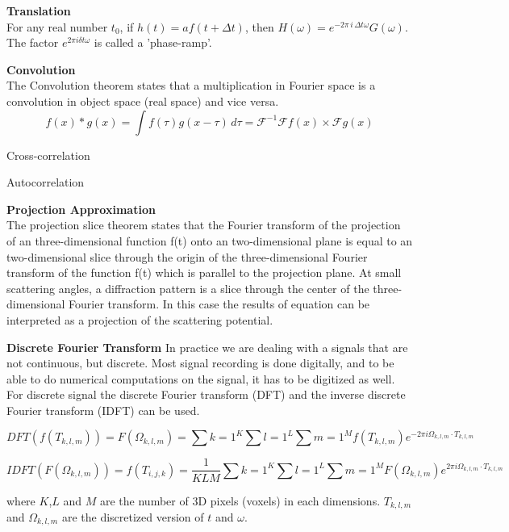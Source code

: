 \textbf{Translation}\\
	For any real number $t_0$, if $h(t) = a f(t+\Delta t)$, then $H(\omega) = e^{-2\pi\,i\,\Delta t \omega} G(\omega)$. The factor $e^{2 \pi i \delta t \omega}$ is called a 'phase-ramp'.

\textbf{Convolution}\\
The Convolution theorem states that a multiplication in Fourier space is a convolution in object space (real space) and vice versa.
\begin{equation}
f(x) * g(x) = \int f(\tau)g(x-\tau)\,d\tau = \mathcal{F}^{-1} {\mathcal{F}f(x)\times\mathcal{F}g(x)}
\end{equation}

Cross-correlation

Autocorrelation

\textbf{Projection Approximation}\\
The projection slice theorem states that the Fourier transform of the projection of an three-dimensional function f(t) onto an two-dimensional plane is equal to an two-dimensional slice through the origin of the three-dimensional Fourier transform of the function f(t)
which is parallel to the projection plane. At small scattering angles, a diffraction pattern is a slice through the center of the three-dimensional Fourier transform. In this case the results of equation can be interpreted as a projection of the scattering potential. 

\textbf{Discrete Fourier Transform}
In practice we are dealing with a signals that are not continuous, but discrete. Most signal recording is done digitally, and to be able to do numerical computations on the signal, it has to be digitized as well. For discrete signal the discrete Fourier transform (DFT) and the inverse discrete Fourier transform (IDFT) can be used.

\begin{equation}
DFT( f( T_{k,l,m} ) ) = F( \Omega_{k,l,m} ) = \sum\limits{k=1}^{K} \sum\limits{l=1}^{L} \sum \limits{m=1}^{M} f( T_{k,l,m} ) e^{-2 \pi i \Omega_{k,l,m} \cdot T_{k,l,m}}
\end{equation}

\begin{equation}
IDFT( F( \Omega_{k,l,m} ) ) = f ( T_{i,j,k} ) = \frac{1}{{K L M}} \sum\limits{k=1}^{K} \sum\limits{l=1}^{L}\sum\limits{m=1}^{M} F( \Omega_{k,l,m} ) e^{2 \pi i \Omega_{k,l,m} \cdot T_{k,l,m} }
\end{equation}

where $K$,$L$ and $M$ are the number of 3D pixels (voxels) in each dimensions. $T_{k,l,m}$ and $\Omega_{k,l,m}$ are the discretized version of $t$ and $\omega$. 


